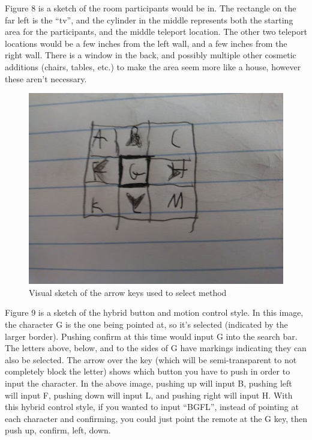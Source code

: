 \documentclass{vgtc}                          %
\begin{document}
Figure 8 is a sketch of the room participants would be in. The rectangle on the far left is the “tv”, and the cylinder in the middle represents both the starting area for the participants, and the middle teleport location. The other two teleport locations would be a few inches from the left wall, and a few inches from the right wall. There is a window in the back, and possibly multiple other cosmetic additions (chairs, tables, etc.) to make the area seem more like a house, however these aren’t necessary. \\[1em]
\begin{figure}[h!]
 \centering %
 \includegraphics[width=\columnwidth]{img3.jpeg}
 \caption{Visual sketch of the arrow keys used to select method}
 \label{fig:keys}
\end{figure}
Figure 9 is a sketch of the hybrid button and motion control style. In this image, the character G is the one being pointed at, so it’s selected (indicated by the larger border). Pushing confirm at this time would input G into the search bar. The letters above, below, and to the sides of G have markings indicating they can also be selected. The arrow over the key (which will be semi-transparent to not completely block the letter) shows which button you have to push in order to input the character. In the above image, pushing up will input B, pushing left will input F, pushing down will input L, and pushing right will input H. With this hybrid control style, if you wanted to input “BGFL”, instead of pointing at each character and confirming, you could just point the remote at the G key, then push up, confirm, left, down.\\[1em]
\end{document}
